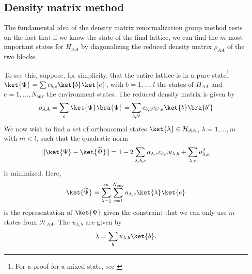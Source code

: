 \subsection{Density matrix method}

The fundamental idea of the density matrix renormalization group method
rests on the fact that if we know the state of the final lattice, we can find the $m$
most important states for $H_{AA}$ by diagonalizing the reduced density
matrix $\rho_{AA}$ of the two blocks.

To see this, suppose, for simplicity, that the entire lattice is in a pure
state\footnote{For a proof for a mixed state, see \cite{noack1999workshop}} $\ket{\Psi} = \sum c_{b, e} \ket{b} \ket{e}$, with $b = 1, \ldots, l$ the
states of $H_{AA}$ and $e = 1, \ldots, N_{\text{env}}$ the environment states. The
reduced density matrix is given by
\begin{equation}\label{eq:density_matrix_superblock}
  \rho_{AA} = \sum_{e} \ket{\Psi} \bra{\Psi} = \sum_{b, b'} c_{b, e} c_{b', e} \ket{b} \bra{b'}
\end{equation}
We now wish to find a set of orthonormal states $\ket{\lambda} \in \mathcal{H}_{AA}$,
$\lambda = 1, \ldots, m$ with $m < l$, such that the quadratic norm
\begin{equation}\label{eq:quadratic_norm}
  \Vert \ket{\Psi} - \ket{\widetilde{\Psi}} \Vert = 1 - 2 \sum_{\lambda, b, e} a_{\lambda, e} c_{b, e} u_{\lambda, b} + \sum_{\lambda, e} a_{\lambda, e}^2
\end{equation}
is minimized. Here,
\begin{equation}
  \ket{\widetilde{\Psi}} = \sum_{\lambda = 1}^{m} \sum_{e = 1}^{N_{\text{env}}} a_{\lambda, e} \ket{\lambda} \ket{e}
\end{equation}
is the representation of $\ket{\Psi}$ given the constraint that we can only use
$m$ states from $\mathcal{H}_{AA}$. The $u_{\lambda, b}$ are given by
\begin{equation}
  \lambda = \sum_{b} u_{\lambda, b} \ket{b}.
\end{equation}

